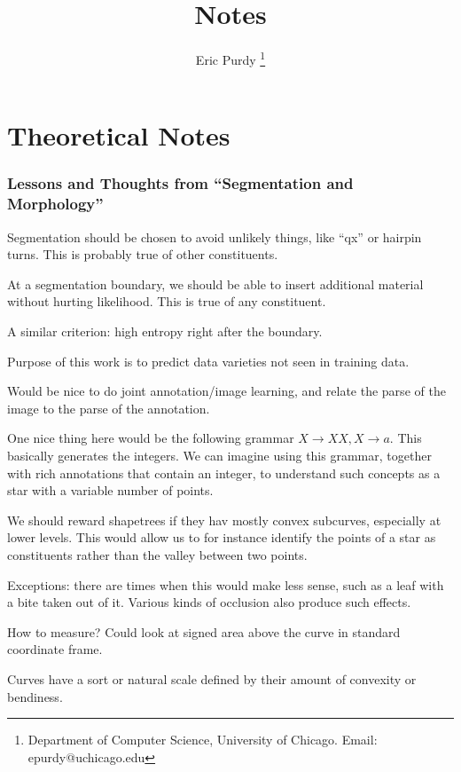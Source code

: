 \documentclass{article}
\title{Notes}
\author{Eric Purdy \footnote{Department of Computer Science, University of Chicago. Email: epurdy@uchicago.edu}}
\begin{document}
\maketitle

\tableofcontents

\part{Theoretical Notes}

\section{Lessons and Thoughts from ``Segmentation and Morphology''}

\bitem
\item Segmentation should be chosen to avoid unlikely things, like
  ``qx'' or hairpin turns. This is probably true of other
  constituents.
\item At a segmentation boundary, we should be able to insert
  additional material without hurting likelihood. This is true of any
  constituent.

  A similar criterion: high entropy right after the boundary.

\item Purpose of this work is to predict data varieties not seen in
  training data.
\item Would be nice to do joint annotation/image learning, and relate
  the parse of the image to the parse of the annotation.

  One nice thing here would be the following grammar $X\to XX, X\to
  a$. This basically generates the integers. We can imagine using this
  grammar, together with rich annotations that contain an integer, to
  understand such concepts as a star with a variable number of points.

\item We should reward shapetrees if they hav mostly convex subcurves,
  especially at lower levels. This would allow us to for instance
  identify the points of a star as constituents rather than the valley
  between two points.

  Exceptions: there are times when this would make less sense, such as
  a leaf with a bite taken out of it. Various kinds of occlusion also
  produce such effects.

  How to measure? Could look at signed area above the curve in
  standard coordinate frame.

\item Curves have a sort or natural scale defined by their amount of
  convexity or bendiness.
\end{document}
